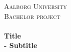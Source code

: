 \begin{titlingpage}\centering



\textsc{\LARGE Aalborg University}\\[0.3cm]

\textsc{\Large Bachelor project}\\[0.3cm]

\HRule \\[0.4cm]
{\huge \bfseries Title}\\[0.5cm]
{\Large \bfseries - Subtitle}

\HRule \\[2cm]


\end{titlingpage}
